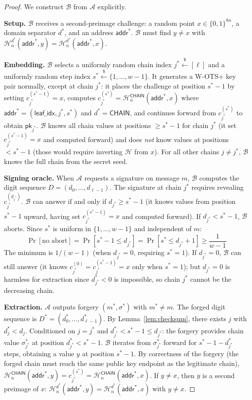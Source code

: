 \documentclass[11pt]{article}
\newcommand{\hash}{\mathcal{H}}
\newcommand{\bin}{\{0,1\}}
\begin{document}
\begin{proof}
We construct $\mathcal{B}$ from $\mathcal{A}$ explicitly.

\textbf{Setup.} $\mathcal{B}$ receives a second-preimage challenge:
a random point $x \in \bin^{8n}$, a domain separator $d^*$, and an
address $\mathsf{addr}^*$. $\mathcal{B}$ must find $y \neq x$ with
$\hash_n^{d^*}(\mathsf{addr}^*, y) = \hash_n^{d^*}(\mathsf{addr}^*, x)$.

\textbf{Embedding.} $\mathcal{B}$ selects a uniformly random chain
index $j^* \xleftarrow{\$} [\ell]$ and a uniformly random step index
$s^* \xleftarrow{\$} \{1, \ldots, w - 1\}$. It generates a W-OTS+
key pair normally, except at chain $j^*$: it places the challenge at
position $s^* - 1$ by setting $c_{j^*}^{(s^*-1)} = x$, computes
$c_{j^*}^{(s^*)} = \hash_n^{\mathsf{CHAIN}}(\mathsf{addr}^*, x)$
where $\mathsf{addr}^* = (\mathsf{leaf\_idx}, j^*, s^*)$ and
$d^* = \mathsf{CHAIN}$, and continues forward from $c_{j^*}^{(s^*)}$
to obtain $\mathsf{pk}_{j^*}$. $\mathcal{B}$ knows all chain values
at positions $\geq s^* - 1$ for chain $j^*$ (it set
$c_{j^*}^{(s^*-1)} = x$ and computed forward) and does \emph{not}
know values at positions $< s^* - 1$ (those would require inverting
$\hash$ from $x$). For all other chains $j \neq j^*$,
$\mathcal{B}$ knows the full chain from the secret seed.

\textbf{Signing oracle.} When $\mathcal{A}$ requests a signature on
message $m$, $\mathcal{B}$ computes the digit sequence $D = (d_0,
\ldots, d_{\ell-1})$. The signature at chain $j^*$ requires revealing
$c_{j^*}^{(d_{j^*})}$. $\mathcal{B}$ can answer if and only if
$d_{j^*} \geq s^* - 1$ (it knows values from position $s^* - 1$
upward, having set $c_{j^*}^{(s^*-1)} = x$ and computed forward). If
$d_{j^*} < s^* - 1$, $\mathcal{B}$ aborts. Since $s^*$ is uniform in
$\{1, \ldots, w-1\}$ and independent of $m$:
\[
\Pr[\text{no abort}] = \Pr[s^* - 1 \leq d_{j^*}] = \Pr[s^* \leq d_{j^*} + 1]
\geq \frac{1}{w - 1}
\]
The minimum is $1/(w-1)$ (when $d_{j^*} = 0$, requiring $s^* = 1$).
If $d_{j^*} = 0$, $\mathcal{B}$ can still answer (it knows
$c_{j^*}^{(0)} = c_{j^*}^{(s^*-1)} = x$ only when $s^* = 1$); but
$d_{j^*} = 0$ is harmless for extraction since $d^*_{j^*} < 0$ is
impossible, so chain $j^*$ cannot be the decreasing chain.

\textbf{Extraction.} $\mathcal{A}$ outputs forgery $(m^*, \sigma^*)$
with $m^* \neq m$. The forged digit sequence is $D^* = (d^*_0,
\ldots, d^*_{\ell-1})$. By Lemma~\ref{lem:checksum}, there exists
$j$ with $d^*_j < d_j$. Conditioned on $j = j^*$ and $d^*_{j^*} <
s^* - 1 \leq d_{j^*}$: the forgery provides chain value
$\sigma^*_{j^*}$ at position $d^*_{j^*} < s^* - 1$.
$\mathcal{B}$ iterates from $\sigma^*_{j^*}$ forward for
$s^* - 1 - d^*_{j^*}$ steps, obtaining a value $y$ at position
$s^* - 1$. By correctness of the forgery (the forged chain must
reach the same public key endpoint as the legitimate chain),
$\hash_n^{\mathsf{CHAIN}}(\mathsf{addr}^*, y) = c_{j^*}^{(s^*)}
= \hash_n^{\mathsf{CHAIN}}(\mathsf{addr}^*, x)$. If $y \neq x$,
then $y$ is a second preimage of $x$:
$\hash_n^{d^*}(\mathsf{addr}^*, y) =
\hash_n^{d^*}(\mathsf{addr}^*, x)$ with $y \neq x$.


\end{proof}
\end{document}

